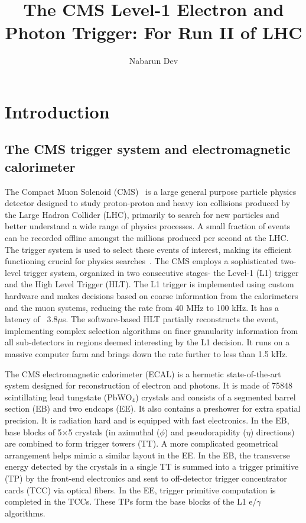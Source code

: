 \documentclass[a4paper,11pt]{article}
\title{\boldmath The CMS Level-1 Electron and Photon Trigger: For Run II of LHC}
\author[a]{Nabarun Dev}
\affiliation[a]{Department of physics, University of Notre Dame, Indiana, USA}
\begin{document}
\linenumbers

\maketitle
\flushbottom

\section{Introduction}
\label{sec:intro}
\subsection{The CMS trigger system and electromagnetic calorimeter}
\label{subsec:cmstriggerecal}
The Compact Muon Solenoid (CMS)~\cite{a} is a large general purpose particle physics  detector  designed to study proton-proton and heavy ion collisions produced by the Large Hadron Collider (LHC), primarily to search for new particles and better understand a wide range of physics processes. A small fraction of events can be recorded offline amongst the millions produced per second at the LHC.  The trigger system is used to select these events of interest, making its efficient functioning crucial for physics searches~\cite{b}. The CMS employs a sophisticated two-level trigger system, organized in two consecutive stages- the Level-1 (L1) trigger and the High Level Trigger (HLT). The L1 trigger is implemented using custom hardware and makes decisions based on coarse information from the calorimeters and the muon systems, reducing the rate from 40 MHz to 100 kHz. It has a latency of ~3.8$\mu$s. The software-based HLT partially reconstructs the event, implementing complex selection algorithms on finer granularity information from all sub-detectors in regions deemed interesting by the L1 decision. It runs on a massive computer farm and brings down the rate further to less than 1.5 kHz.

The CMS electromagnetic calorimeter (ECAL) is a hermetic state-of-the-art system designed for reconstruction of electron and photons. It is made of 75848 scintillating lead tungstate (PbWO$_4$) crystals and consists of a segmented barrel section (EB) and two endcaps (EE). It also contains a preshower for extra spatial precision. It is radiation hard and is equipped with fast electronics. In the EB, base blocks of 5$\times$5 crystals (in azimuthal ($\phi$) and pseudorapidity ($\eta$) directions) are combined to form trigger towers (TT). A more complicated geometrical arrangement helps mimic a similar layout in the EE. In the EB, the transverse energy detected by the crystals in a single TT is summed into a trigger primitive (TP) by the front-end electronics and sent to off-detector trigger concentrator cards (TCC) via optical fibers. In the EE, trigger primitive computation is completed in the TCCs. These TPs form the base blocks of the L1 e/$\gamma$ algorithms.
\end{document}
